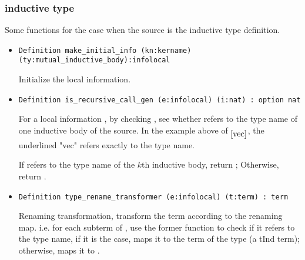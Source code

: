 \documentclass[a4paper,UKenglish,cleveref, autoref, thm-restate]{lipics-v2021}
\begin{document}
\subsubsection{inductive type}
Some functions for the case when the source is the inductive type definition.
\begin{itemize}

\item 
\begin{lstlisting}[language = {Coq}, basicstyle = \small]
Definition make_initial_info (kn:kername) (ty:mutual_inductive_body):infolocal
\end{lstlisting}

Initialize the local information.


\item
\begin{lstlisting}[language = {Coq}, basicstyle = \small]
Definition is_recursive_call_gen (e:infolocal) (i:nat) : option nat
\end{lstlisting}
For a local information , by checking , see whether  refers to the type name of one inductive body of the source. In the example above of $_{\ref{vec}}$, the underlined "vec" refers exactly to the type name.


If  refers to the type name of the $k$th inductive body, return ; Otherwise, return .



\item
\begin{lstlisting}[language = {Coq}, basicstyle = \small]
Definition type_rename_transformer (e:infolocal) (t:term) : term
\end{lstlisting}
Renaming transformation, transform the term  according to the renaming map. i.e. for each subterm  of ,
use the former function to check if it refers to the type name, if it is the case, maps it to the term of the type (a tInd term); otherwise, maps it to . 

\end{itemize}
\end{document}
